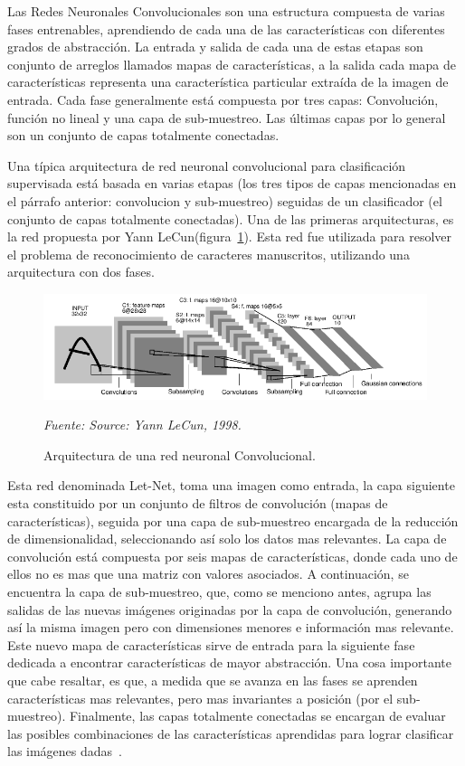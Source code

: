 Las Redes Neuronales Convolucionales son una estructura compuesta de varias fases entrenables, aprendiendo de cada una de las características con diferentes grados de abstracción. La entrada y salida de cada una de estas etapas son conjunto de arreglos llamados mapas de características, a la salida cada mapa de características representa una característica particular extraída de la imagen de entrada. Cada fase generalmente está compuesta por tres capas: Convolución, función no lineal y una capa de sub-muestreo. Las últimas capas por lo general son un conjunto de capas totalmente conectadas.

Una típica arquitectura de red neuronal convolucional para clasificación supervisada está basada en varias etapas (los tres tipos de capas mencionadas en el párrafo anterior: convolucion y sub-muestreo) seguidas de un clasificador (el conjunto de capas totalmente conectadas). Una de las primeras arquitecturas, es la red propuesta por Yann LeCun(figura~\ref{fig:arquitectura_CNN_Lecun}). Esta red fue utilizada para resolver el problema de reconocimiento de caracteres manuscritos, utilizando una arquitectura con dos fases.


\begin{figure}[H]
		\centering
		\includegraphics[width=160mm]{Imagenes/arquitectura_CNN_Lecun.png}
		\caption{Arquitectura de una red neuronal Convolucional.}
		\vspace{0.15cm}
		\textit{Fuente: Source: Yann LeCun, 1998.}
		\label{fig:arquitectura_CNN_Lecun}
\end{figure}

Esta red denominada Let-Net, toma una imagen como entrada, la capa siguiente esta constituido por un conjunto de filtros de convolución (mapas de características), seguida por una capa de sub-muestreo encargada de la reducción de dimensionalidad, seleccionando así solo los datos mas relevantes. La capa de convolución está compuesta por seis mapas de características, donde cada uno de ellos no es mas que una matriz con valores asociados. A continuación, se encuentra la capa de sub-muestreo, que, como se menciono antes, agrupa las salidas de las nuevas imágenes originadas por la capa de convolución, generando así la misma imagen pero con dimensiones menores e información mas relevante. Este nuevo mapa de características sirve de entrada para la siguiente fase dedicada a encontrar características de mayor abstracción. Una cosa importante que cabe resaltar, es que, a medida que se avanza en las fases se aprenden características mas relevantes, pero mas invariantes a posición (por el sub-muestreo). Finalmente, las capas totalmente conectadas se encargan de evaluar las posibles combinaciones de las características aprendidas para lograr clasificar las imágenes dadas~\cite{16pusiol2014redes}.

